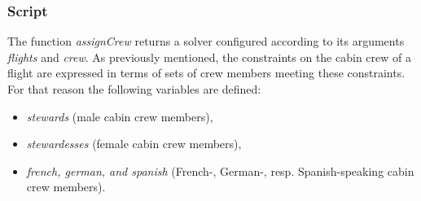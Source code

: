 \documentclass[a4paper]{scrartcl}
\begin{document}
\subsubsection{Script}
The function {\it assignCrew} returns a solver configured according 
to its arguments {\it flights} and {\it crew}. As previously mentioned, 
the constraints on the cabin crew of a flight are expressed in 
terms of sets of crew members meeting these constraints. For 
that reason the following variables are defined: 
\begin{itemize}
\item
{\it stewards} (male cabin crew members), 
\item
{\it stewardesses} (female cabin crew members), 
\item
{\it french, german, and spanish} 
(French-, German-, resp. Spanish-speaking cabin crew members). 
\end{itemize}
\end{document}
